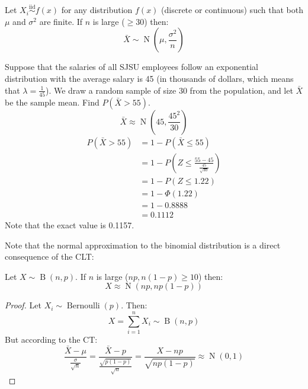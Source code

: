 \documentclass[letterpaper,12pt,fleqn]{article}
\newcommand{\iid}{\overset{\text{iid}}{\sim}}
\newcommand{\m}{\mu}
\renewcommand{\o}{\sigma}
\renewcommand{\P}{\Phi}
\renewcommand{\l}{\lambda}
\newcommand{\xb}{\bar{X}}
\DeclareMathOperator{\nd}{N}
\DeclareMathOperator{\bd}{B}
\DeclareMathOperator{\bernd}{Bernoulli}
\begin{document}
\begin{theorem}
  Let \(X_i\iid f(x)\) for any distribution \(f(x)\) (discrete or continuous) such that both \(\m\) and \(\o^2\) are
  finite.  If \(n\) is large (\(\ge30\)) then:
  \[\xb\sim\nd\left(\m,\frac{\o^2}{n}\right)\]
\end{theorem}

\begin{example}
  Suppose that the salaries of all SJSU employees follow an exponential distribution with the average salary is 45 (in
  thousands of dollars, which means that \(\l=\frac{1}{45}\)).  We draw a random sample of size 30 from the population, and
  let \(\xb\) be the sample mean.  Find \(P(\xb>55)\).
  \[\xb\approx\nd\left(45,\frac{45^2}{30}\right)\]
  \begin{align*}
    P(\xb>55) &= 1-P(\xb\le55) \\
    &= 1-P\left(Z\le\frac{55-45}{\frac{45}{\sqrt{30}}}\right) \\
    &= 1-P(Z\le1.22) \\
    &= 1-\P(1.22) \\
    &= 1-0.8888 \\
    &= 0.1112
  \end{align*}
  Note that the exact value is 0.1157.
\end{example}

Note that the normal approximation to the binomial distribution is a direct consequence of the CLT:

\begin{theorem}
  Let \(X\sim\bd(n,p)\).  If \(n\) is large (\(np,n(1-p)\ge10\)) then:
  \[X\approx\nd(np,np(1-p))\]
\end{theorem}

\begin{proof}
  Let \(X_i\sim\bernd(p)\).  Then:
  \[X=\sum_{i=1}^nX_i\sim\bd(n,p)\]
  But according to the CT:
  \[\frac{\xb-\m}{\frac{\o}{\sqrt{n}}}=\frac{\xb-p}{\frac{\sqrt{p(1-p)}}{\sqrt{n}}}=\frac{X-np}{\sqrt{np(1-p)}}
  \approx\nd(0,1)\]
\end{proof}
\end{document}
